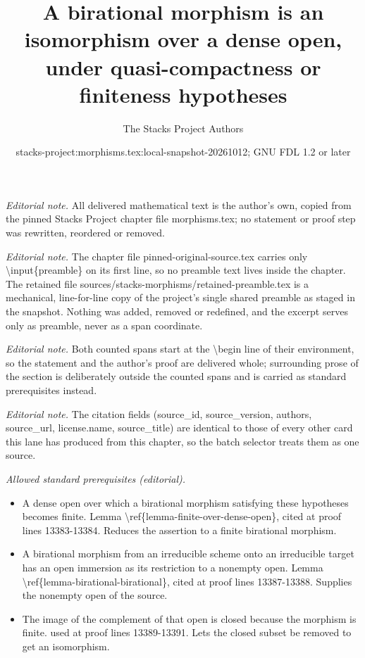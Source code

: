 \documentclass[10pt,a4paper]{amsart}
\title{A birational morphism is an isomorphism over a dense open, under quasi-compactness or finiteness hypotheses}
\author{The Stacks Project Authors}
\date{stacks-project:morphisms.tex:local-snapshot-20261012; GNU FDL 1.2 or later}
\theoremstyle{plain}
\theoremstyle{definition}
\theoremstyle{remark}
\numberwithin{equation}{subsection}
\begin{document}
\maketitle
\setcounter{subsection}{1}
\noindent\textit{Editorial note.} All delivered mathematical text is the author's own, copied from the pinned Stacks Project chapter file morphisms.tex; no statement or proof step was rewritten, reordered or removed.\par\medskip
\noindent\textit{Editorial note.} The chapter file pinned-original-source.tex carries only \textbackslash{}input\{preamble\} on its first line, so no preamble text lives inside the chapter. The retained file sources/stacks-morphisms/retained-preamble.tex is a mechanical, line-for-line copy of the project's single shared preamble as staged in the snapshot. Nothing was added, removed or redefined, and the excerpt serves only as preamble, never as a span coordinate.\par\medskip
\noindent\textit{Editorial note.} Both counted spans start at the \textbackslash{}begin line of their environment, so the statement and the author's proof are delivered whole; surrounding prose of the section is deliberately outside the counted spans and is carried as standard prerequisites instead.\par\medskip
\noindent\textit{Editorial note.} The citation fields (source\_id, source\_version, authors, source\_url, license.name, source\_title) are identical to those of every other card this lane has produced from this chapter, so the batch selector treats them as one source.\par\medskip
\noindent\textit{Allowed standard prerequisites (editorial).}\begin{itemize}
\item A dense open over which a birational morphism satisfying these hypotheses becomes finite. Lemma \textbackslash{}ref\{lemma-finite-over-dense-open\}, cited at proof lines 13383-13384. Reduces the assertion to a finite birational morphism.
\item A birational morphism from an irreducible scheme onto an irreducible target has an open immersion as its restriction to a nonempty open. Lemma \textbackslash{}ref\{lemma-birational-birational\}, cited at proof lines 13387-13388. Supplies the nonempty open of the source.
\item The image of the complement of that open is closed because the morphism is finite. used at proof lines 13389-13391. Lets the closed subset be removed to get an isomorphism.
\end{itemize}\medskip
\end{document}
